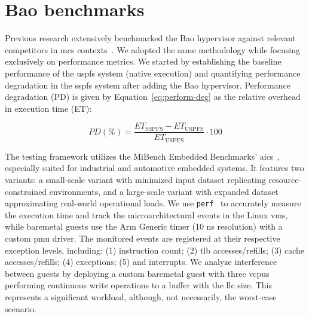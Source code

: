 
\section{Bao benchmarks}
\label{sec:bao-benchmarks}
Previous research extensively benchmarked the Bao hypervisor against relevant
competitors in \gls{mcs} contexts~\cite{martins2023shedding,costaIRQColoring2023}.
We adopted the same methodology while focusing exclusively on performance metrics.
We started by establishing the baseline performance of the \gls{uspfs} system
(native execution) and quantifying performance degradation in the \gls{sspfs}
system after adding the Bao hypervisor. Performance degradation (PD) is
given by Equation~\ref{eq:perform-deg} as the relative overhead in execution
time (ET):

\begin{equation}
  \label{eq:perform-deg}
  PD (\%) =
\frac{ET_{\text{SSPFS}} - ET_{\text{USPFS}}}{ET_{\text{USPFS}}} \cdot 100
\end{equation}


The testing framework utilizes the MiBench Embedded Benchmarks'
\gls{aics}~\cite{guthaus2001mibench}, especially suited for industrial and
automotive embedded systems. It features two variants: a small-scale
variant with minimized input dataset replicating resource-constrained
environments, and a large-scale variant with expanded dataset approximating
real-world operational loads. We use \lstinline{perf}~\cite{perfLinux} to
accurately measure the execution time and track the microarchitectural events in
the Linux \glspl{vm}, while baremetal guests use the Arm Generic timer (10 ns
resolution) with a custom \gls{pmu} driver. The monitored events are registered
at their respective exception levels, including: (1) instruction count; (2)
\gls{tlb} accesses/refills; (3) cache accesses/refills; (4) exceptions; (5) and interrupts.
%
We analyze interference between guests by deploying a custom baremetal guest
with three \glspl{vcpu} performing continuous write operations to a buffer with
the \gls{llc} size. This represents a significant workload, although, not
necessarily, the worst-case scenario.

